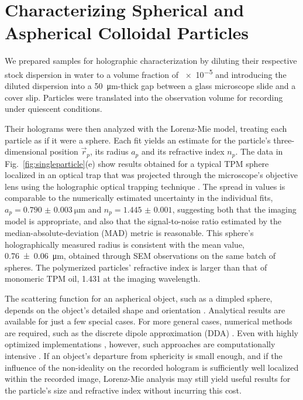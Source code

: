 \section{Characterizing Spherical and Aspherical Colloidal Particles}

We prepared samples for holographic characterization
by diluting their respective stock dispersion in water to a volume fraction of
\num{e-5} and introducing the diluted dispersion into a \SI{50}{\um}-thick gap between a
glass microscope slide and a cover slip. Particles were translated into the
observation volume for recording under quiescent conditions. 

Their holograms were then analyzed with the Lorenz-Mie model, treating each
particle as if it were a sphere.
Each fit yields an estimate for the particle's three-dimensional position $\vec{r}_p$,
its radius $a_p$ and its refractive index $n_p$.
The data in Fig.~\ref{fig:singleparticle}(e) show results obtained for
a typical TPM sphere localized in an optical trap that was
projected through the microscope's objective lens using the
holographic optical trapping technique \cite{dufresne98,grier03}.
The spread in values is comparable to the numerically
estimated uncertainty in the individual fits,
$a_p = \SI{0.790(3)}{\um}$ and $n_p = \num{1.445(1)}$,
suggesting both that
the imaging model is appropriate, and also that the signal-to-noise
ratio estimated by the median-absolute-deviation (MAD) metric
is reasonable.
This sphere's holographically measured radius is consistent with the 
mean value, \SI{0.76(6)}{\um}, obtained through SEM observations 
on the same batch of spheres.
The polymerized particles' refractive index is larger 
than that of monomeric TPM oil, \num{1.431} at the imaging wavelength.

The scattering function for an aspherical object, 
such as a dimpled sphere, depends on the object's detailed shape
and orientation \cite{mishchenko02}.
Analytical results are available for just a few special cases.
For more general cases, numerical methods are required, 
such as the discrete dipole approximation (DDA) \cite{draine94}. 
Even with highly optimized implementations \cite{yurkin11}, however,
such approaches are computationally intensive \cite{fung12,perry12,wang14using}.
If an object's departure from sphericity is small enough, and if the
influence of the non-ideality on the recorded hologram is sufficiently well
localized within the recorded image, Lorenz-Mie analysis
may still yield useful results for the particle's
size and refractive index without incurring this cost.

